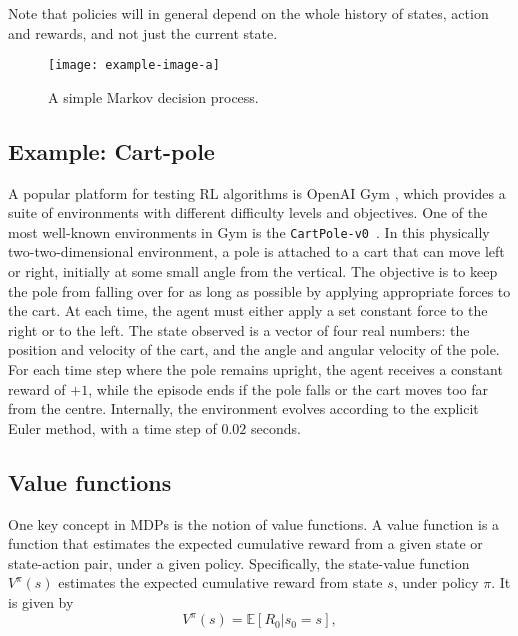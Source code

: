 Note that policies will in general depend on the whole history of states, action and rewards, and not just the current state.

\begin{figure}
    \centering
    \texttt{[image: example-image-a]}

    \caption{A simple Markov decision process.}
    \label{fig:mdp}
\end{figure}


\subsection{Example: Cart-pole}
A popular platform for testing RL algorithms is OpenAI Gym \autocite{gym}, which provides a suite of environments with different difficulty levels and objectives.
One of the most well-known environments in Gym is the \texttt{CartPole-v0}~\autocite{barto1983}.
In this physically two-two-dimensional environment, a pole is attached to a cart that can move left or right, initially at some small angle from the vertical.
The objective is to keep the pole from falling over for as long as possible by applying appropriate forces to the cart.
At each time, the agent must either apply a set constant force to the right or to the left.
The state observed is a vector of four real numbers: the position and velocity of the cart, and the angle and angular velocity of the pole.
For each time step where the pole remains upright, the agent receives a constant reward of $+1$, while the episode ends if the pole falls or the cart moves too far from the centre.
Internally, the environment evolves according to the explicit Euler method, with a time step of $0.02$ seconds\footnotemark.



\subsection{Value functions}
One key concept in MDPs is the notion of value functions.
A value function is a function that estimates the expected cumulative reward from a given state or state-action pair, under a given policy.
Specifically, the state-value function $V^{\pi}(s)$ estimates the expected cumulative reward from state $s$, under policy $\pi$.
It is given by
\begin{equation}
    V^{\pi}(s) = \mathbb{E} \left[ R_0 | s_0 = s \right],
\end{equation}

